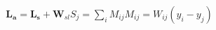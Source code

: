 \documentclass[preview]{standalone}
\begin{document}
\begin{align*}
\mathbf{ L _a} = \mathbf{ L _s} + \mathbf{W}_{sl} S_j  = \sum_i  M_{ij} M_{ij}  = W_{ij}(y_i - y_j)
\end{align*}
\end{document}
